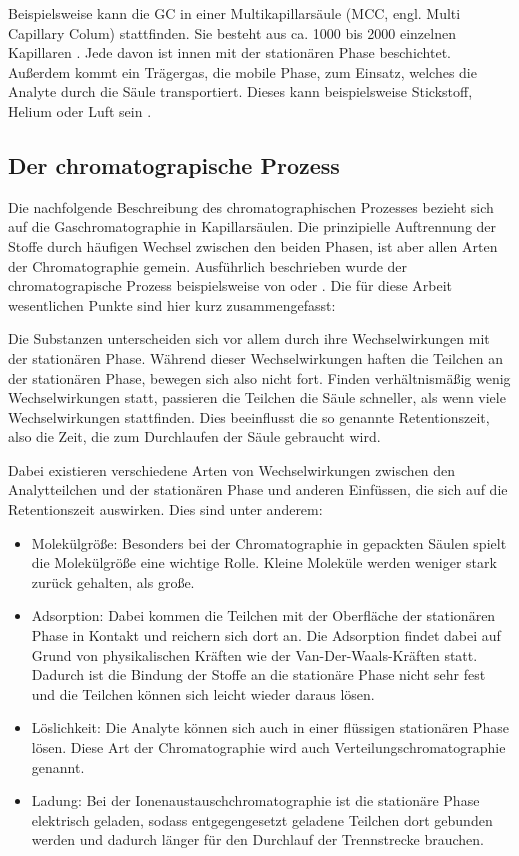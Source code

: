 Beispielsweise kann die GC in einer Multikapillarsäule (MCC, engl. Multi Capillary Colum) stattfinden. Sie besteht aus ca. 1000 bis 2000 einzelnen Kapillaren \citep{obinski1999, Baumbach2009}. Jede davon ist innen mit der stationären Phase beschichtet. Außerdem kommt ein Trägergas, die mobile Phase, zum Einsatz, welches die Analyte durch die Säule transportiert. Dieses kann beispielsweise Stickstoff, Helium \citep{obinski1999} oder Luft sein \citep{Baumbach2009}.

\subsection{Der chromatograpische Prozess}
Die nachfolgende Beschreibung des chromatographischen Prozesses bezieht sich auf die Gaschromatographie in Kapillarsäulen. Die prinzipielle Auftrennung der Stoffe durch häufigen Wechsel zwischen den beiden Phasen, ist aber allen Arten der Chromatographie gemein.
Ausführlich beschrieben wurde der chromatograpische Prozess beispielsweise von \cite{kolb2003} oder \cite{kaltenboeck2008}.
Die für diese Arbeit wesentlichen Punkte sind hier kurz zusammengefasst:

Die Substanzen unterscheiden sich vor allem durch ihre Wechselwirkungen mit der stationären Phase. Während dieser Wechselwirkungen haften die Teilchen an der stationären Phase, bewegen sich also nicht fort. Finden verhältnismäßig wenig Wechselwirkungen statt, passieren die Teilchen die Säule schneller, als wenn viele Wechselwirkungen stattfinden. Dies beeinflusst die so genannte Retentionszeit, also die Zeit, die zum Durchlaufen der Säule gebraucht wird.

Dabei existieren verschiedene Arten von Wechselwirkungen zwischen den Analytteilchen und der stationären Phase und anderen Einfüssen, die sich auf die Retentionszeit auswirken. Dies sind unter anderem:
\begin{itemize}
 \item Molekülgröße: Besonders bei der Chromatographie in gepackten Säulen spielt die Molekülgröße eine wichtige Rolle. Kleine Moleküle werden weniger stark zurück gehalten, als große.
 \item Adsorption: Dabei kommen die Teilchen mit der Oberfläche der stationären Phase in Kontakt und reichern sich dort an. Die Adsorption findet dabei auf Grund von physikalischen Kräften wie der Van-Der-Waals-Kräften statt. Dadurch ist die Bindung der Stoffe an die stationäre Phase nicht sehr fest und die Teilchen können sich leicht wieder daraus lösen.
 \item Löslichkeit: Die Analyte können sich auch in einer flüssigen stationären Phase lösen. Diese Art der Chromatographie wird auch Verteilungschromatographie genannt.
 \item Ladung: Bei der Ionenaustauschchromatographie ist die stationäre Phase elektrisch geladen, sodass entgegengesetzt geladene Teilchen dort gebunden werden und dadurch länger für den Durchlauf der Trennstrecke brauchen.
\end{itemize}


